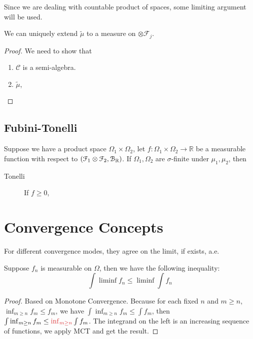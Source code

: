 Since we are dealing with countable product of spaces, some limiting argument will be used. 
\begin{thm}
    We can uniquely extend \(\tilde{\mu}\) to a measure on \(\otimes \mathcal{F}_{j}\). 
\end{thm}
\begin{proof}
    We need to show that 
    \begin{enumerate}
        \item \(\mathcal{C}\) is a semi-algebra.
        \item \(\tilde{\mu}\), 
    \end{enumerate}
\end{proof}


\subsection{Fubini-Tonelli}
\begin{thm}
    Suppose we have a product space \(\Omega_{1}\times \Omega_{2}\), let \(f: \Omega_{1}\times \Omega_{2} \to \mathbb{R}\) be a measurable function with respect to \(\pqty{\mathcal{F}_{1} \otimes \mathcal{F}_{2}, \mathcal{B}_{\mathbb{R}}}\). If \(\Omega_{1}, \Omega_{2}\) are \(\sigma\)-finite under \(\mu_{1}, \mu_{2}\), then
    \begin{description}
        \item[Tonelli] If \(f\geq 0\), 
    \end{description}
\end{thm}

\section{Convergence Concepts}

\begin{proposition}
    For different convergence modes, they agree on the limit, if exists, a.e. 
\end{proposition}


\begin{thm}
    Suppose \(f_{n}\) is measurable on \(\Omega\), then we have the following inequality:
    \begin{equation*}
        \int \liminf f_{n}\leq \liminf \int f_{n} 
    \end{equation*}
\end{thm}
\begin{proof}
    Based on Monotone Convergence. Because for each fixed \(n\) and \(m \geq n\), \(\inf_{m\geq n} f_{m} \leq f_{m}\), we have \(\int \inf_{m\geq n} f_{m} \leq \int f_{m}\), then \(\int \inf_{m\geq n} f_{m} \leq \red{\inf_{m \geq n}}\int f_{m}\). The integrand on the left is an increasing sequence of functions, we apply MCT and get the result. 
\end{proof}

